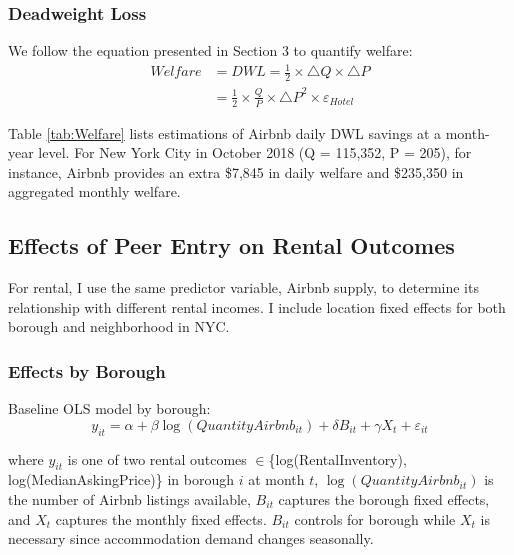 \documentclass[12pt]{article}
\begin{document}
			\subsubsection{Deadweight Loss}
				We follow the equation presented in Section 3 to quantify welfare:
				\begin{equation}
					\begin{split}
					Welfare & = DWL = \frac{1}{2} \times  \bigtriangleup Q \times \bigtriangleup P \\
					& = \frac{1}{2} \times \frac{Q}{P} \times {\bigtriangleup P}^2 \times \varepsilon_{Hotel}
				\end{split}
			\end{equation}
				
				\par
				Table \ref{tab:Welfare} lists estimations of Airbnb daily DWL savings at a month-year level. For New York City in October 2018 (Q = 115,352, P = 205), for instance, Airbnb provides an extra \$7,845 in daily welfare and \$235,350 in aggregated monthly welfare.
		
		\subsection{Effects of Peer Entry on Rental Outcomes} %
			For rental, I use the same predictor variable, Airbnb supply, to determine its relationship with different rental incomes. I include location fixed effects for both borough and neighborhood in NYC.
			
			\subsubsection{Effects by Borough}
				Baseline OLS model by borough:
				\begin{equation}
					\label {eq:RentalBorough}
					y_{it} = \alpha + \beta \log(QuantityAirbnb_{it}) + \delta B_{it} + \gamma X_t + \varepsilon_{it}
				\end{equation}
			
				\par
				where $y_{it}$ is one of two rental outcomes $\in$\{log(RentalInventory), log(MedianAskingPrice)\} in borough $i$ at month $t$, $\log(QuantityAirbnb_{it})$ is the number of Airbnb listings available, $B_{it}$ captures the borough fixed effects, and $X_t$ captures the monthly fixed effects. $B_{it}$ controls for borough while $X_t$ is necessary since accommodation demand changes seasonally.
	
\end{document}
